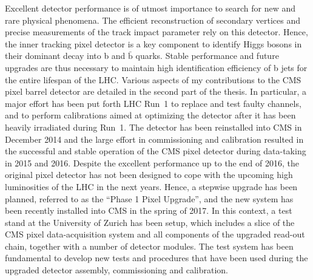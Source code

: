 \noindent Excellent detector performance is of utmost importance to search for new and rare physical phenomena.
The efficient reconstruction of secondary vertices and precise measurements of the track impact parameter rely on this detector.
Hence, the inner tracking pixel detector is a key component to identify Higgs bosons in their dominant decay into b and $\bar{\mathrm{b}}$ quarks.
Stable performance and future upgrades are thus necessary to maintain high identification efficiency of b jets for the entire lifespan of the LHC.
Various aspects of my contributions to the CMS pixel barrel detector are detailed in the second part of the thesis.
In particular, a major effort has been put forth LHC Run~1 to replace and test faulty channels,
and to perform calibrations aimed at optimizing the detector after it has been heavily irradiated during Run~1.
The detector has been reinstalled into CMS in December 2014 and the large effort in commissioning and calibration 
resulted in the successful and stable operation of the CMS pixel detector during data-taking in 2015 and 2016.
Despite the excellent performance up to the end of 2016, the original pixel detector has not been designed to cope with the upcoming high luminosities of the LHC in the next years.
Hence, a stepwise upgrade has been planned, referred to as the ``Phase 1 Pixel Upgrade'', and the new system has been recently installed into CMS in the spring of 2017.
In this context, a test stand at the University of Zurich has been setup, which includes a slice of the CMS pixel data-acquisition system and all components of the upgraded read-out chain, together with a number of detector modules.
The test system has been fundamental to develop new tests and procedures that have been used during the upgraded detector assembly, commissioning and calibration.

\vspace*{\fill}
